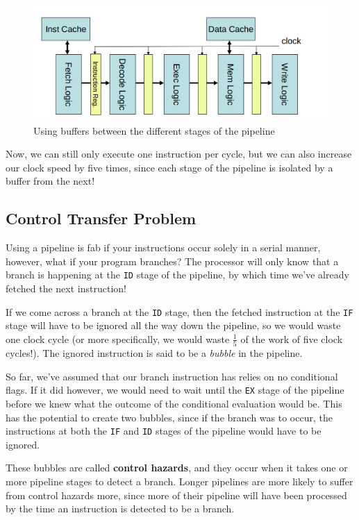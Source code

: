 \begin{figure}[ht]
  \centering
  \includegraphics[width=\textwidth]{images/basic-pipeline}
  \caption{Using buffers between the different stages of the pipeline}
  \label{basic-pipeline}
\end{figure}

Now, we can still only execute one instruction per cycle, but we can also
increase our clock speed by five times, since each stage of the pipeline is
isolated by a buffer from the next!

\subsection{Control Transfer Problem}

Using a pipeline is fab if your instructions occur solely in a serial manner,
however, what if your program branches? The processor will only know that a
branch is happening at the \texttt{ID} stage of the pipeline, by which time
we've already fetched the next instruction!

If we come across a branch at the \texttt{ID} stage, then the fetched
instruction at the \texttt{IF} stage will have to be ignored all the way down
the pipeline, so we would waste one clock cycle (or more specifically, we would
waste $\frac{1}{5}$ of the work of five clock cycles!). The ignored instruction
is said to be a \textit{bubble} in the pipeline.

So far, we've assumed that our branch instruction has relies on no conditional
flags. If it did however, we would need to wait until the \texttt{EX} stage of
the pipeline before we knew what the outcome of the conditional evaluation would
be. This has the potential to create two bubbles, since if the branch was to
occur, the instructions at both the \texttt{IF} and \texttt{ID} stages of the
pipeline would have to be ignored.

These bubbles are called \textbf{control hazards}, and they occur when it takes
one or more pipeline stages to detect a branch. Longer pipelines are more likely
to suffer from control hazards more, since more of their pipeline will have been
processed by the time an instruction is detected to be a branch.

